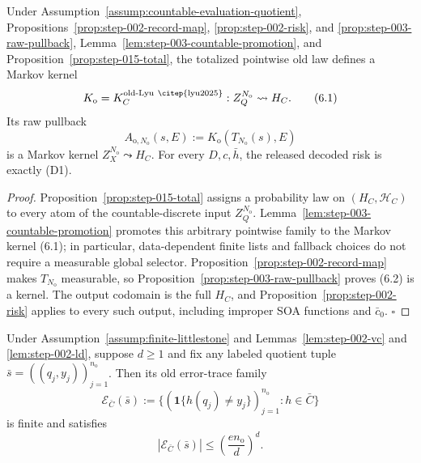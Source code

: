 \begin{proposition}\label{prop:step-015-kernel}
Under Assumption~\ref{assump:countable-evaluation-quotient}, 
Propositions~\ref{prop:step-002-record-map},
\ref{prop:step-002-risk}, and
\ref{prop:step-003-raw-pullback}, Lemma~\ref{lem:step-003-countable-promotion}, and
Proposition~\ref{prop:step-015-total}, the totalized pointwise old law
defines a Markov kernel
\[
K_{\mathrm o}=K_C^{\mathrm{old\text{-}Lyu~\citep{lyu2025}}}:
Z_Q^{N_{\mathrm o}}\leadsto H_C.
\tag{6.1}
\]
Its raw pullback
\[
A_{\mathrm o,N_{\mathrm o}}(s,E)
:=K_{\mathrm o}(T_{N_{\mathrm o}}(s),E)
\tag{6.2}
\]
is a Markov kernel
\(Z_X^{N_{\mathrm o}}\leadsto H_C\). For every \(D,c,\bar h\),
the released decoded risk is exactly (D1).


\end{proposition}

\begin{proof}
Proposition~\ref{prop:step-015-total} assigns a probability law on
\((H_C,\mathcal H_C)\) to every atom of the countable-discrete input
\(Z_Q^{N_{\mathrm o}}\). Lemma~\ref{lem:step-003-countable-promotion} promotes this arbitrary
pointwise family to the Markov kernel (6.1); in particular, data-dependent
finite lists and fallback choices do not require a measurable global
selector. Proposition~\ref{prop:step-002-record-map} makes
\(T_{N_{\mathrm o}}\) measurable, so Proposition~\ref{prop:step-003-raw-pullback} proves (6.2) is a kernel.
The output codomain is the full \(H_C\), and Proposition~\ref{prop:step-002-risk} applies to every such output,
including improper SOA functions and \(\bar c_0\). \(\square\)


\end{proof}

\begin{lemma}\label{lem:step-015-traces}
Under Assumption~\ref{assump:finite-littlestone} and 
Lemmas~\ref{lem:step-002-vc} and \ref{lem:step-002-ld}, suppose \(d\ge1\)
and fix any labeled quotient tuple
\(\bar s=((q_j,y_j))_{j=1}^{n_{\mathrm o}}\). Then its old error-trace
family
\[
\mathcal E_{\bar C}(\bar s)
:=\{(\mathbf1\{h(q_j)\ne y_j\})_{j=1}^{n_{\mathrm o}}:
h\in\bar C\}
\tag{7.1}
\]
is finite and satisfies
\[
|\mathcal E_{\bar C}(\bar s)|
\le\left(\frac{en_{\mathrm o}}d\right)^d.
\tag{7.2}
\]


\end{lemma}

